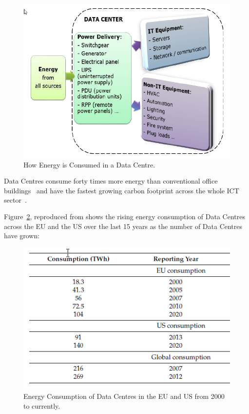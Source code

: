 \documentclass[12pt]{scrartcl}
\begin{document}
\begin{figure}[h]
  \caption{How Energy is Consumed in a Data Centre.}
  \label{fig:DCenergy}
  \centering
    \includegraphics[scale=0.35]{Data_center_energy.png}
\end{figure}


Data Centres consume forty times more energy than conventional office buildings~\citep{edsdoj.99f37e7899fb4fcaabdaa81e395626c420180101} and have the fastest growing carbon footprint across the whole ICT sector~\citep{edsbas.13818AC20170101}.

Figure~\ref{fig:DCenergyEU-US}, reproduced from \citet{edsbas.13818AC20170101} shows the rising energy consumption of Data Centres across the EU and the US over the last 15 years as the number of Data Centres have grown:

\begin{figure}[h]
  \caption{Energy Consumption of Data Centres in the EU and US from 2000 to currently.}
  \label{fig:DCenergyEU-US}
  \centering
    \includegraphics[scale=0.45]{Energy_consumption.png}
\end{figure}
\end{document}

